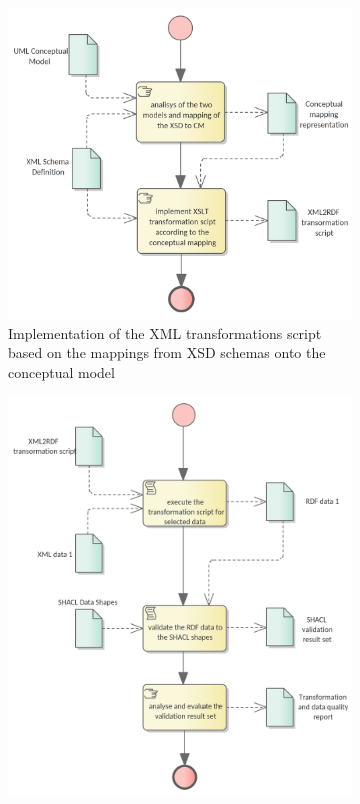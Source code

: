 	\begin{figure}
		\centering
		\begin{subfigure}[b]{.48\textwidth}
			\centering
			\includegraphics[width=1.05\linewidth]{../img/xml2rdfScriptCreation.png}
			\caption{Implementation of the XML transformations script based on the mappings from XSD schemas onto the conceptual model}
			\label{fig:sub1}
		\end{subfigure}%
		\quad
		\begin{subfigure}[b]{.48\textwidth}
			\centering
			\includegraphics[width=1.05\linewidth]{../img/xmlDataTransformation.png}

\end{subfigure}
\end{figure}
